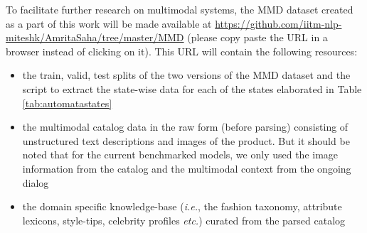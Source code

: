 \documentclass[letterpaper]{article} %
\begin{document}

To facilitate further research on multimodal systems, the MMD dataset created as a part of this work will be made available at  \url{https://github.com/iitm-nlp-miteshk/AmritaSaha/tree/master/MMD} (please copy paste the URL in a browser instead of clicking on it). This URL will contain the following resources:
\begin{itemize}
\item the train, valid, test splits of the two versions of the MMD dataset and the script to extract the state-wise data for each of the states elaborated in Table \ref{tab:automatastates}
\item the multimodal catalog data in the raw form (before parsing) consisting of unstructured text descriptions and images of the product. But it should be noted that for the current benchmarked models, we only used the image information from the catalog and the multimodal context from the ongoing dialog
\item the domain specific knowledge-base (\textit{i.e.}, the fashion taxonomy, attribute lexicons, style-tips, celebrity profiles \textit{etc.}) curated from the parsed catalog
\end{itemize}
\end{document}
